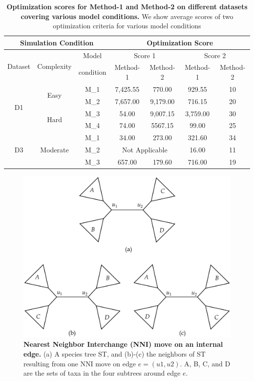 \documentclass[a4paper]{article}
\begin{document}
\begin{table}[h]
    \centering
    \caption{\textbf{Optimization scores for Method-1 and Method-2 on different datasets
covering various model conditions.} We show average scores of two optimization
criteria for various model conditions}
    \begin{tabular}{|c|cc|cc|cc|}
         \hline
         \multicolumn{3}{|c|}{Simulation Condition} & \multicolumn{4}{|c|}{Optimization Score} \\
         \hline
         \multirow{2}{*}{Dataset} & \multirow{2}{*}{Complexity} & Model & \multicolumn{2}{|c|}{Score 1} &  \multicolumn{2}{|c|}{Score 2} \\
         \cline{4-7}
         & & condition & Method-1 & Method-2 & Method-1 & Method-2 \\
         \hline
         \hline
         \multirow{4}{*}{D1} & \multirow{2}{*}{Easy} & M_1 & 7,425.55 & 770.00 & 929.55 & 10 \\
         & & M_2 & 7,657.00 & 9,179.00 & 716.15 & 20 \\
         \cline{2-7}
         & \multirow{2}{*}{Hard} & M_3 & 54.00 & 9,007.15 & 3,759.00 & 30 \\
         & & M_4 & 74.00 & 5567.15 & 99.00 & 25 \\
         \hline
         \hline
         \multirow{3}{*}{D3} & \multirow{3}{*}{Moderate} & M_1 & 34.00 & 273.00 & 321.60 & 34 \\
         & & M_2 & \multicolumn{2}{|c|}{Not Applicable} & 16.00  & 11 \\
         & & M_3 & 657.00 & 179.60 & 716.00 & 19 \\
         \hline
    \end{tabular}
    
    \label{tab:table1}
\end{table}
\pagebreak
\begin{figure}[t]
    \centering
    \includegraphics[width=.7\textwidth]{Figure3}
    \caption{ \textbf{Nearest Neighbor Interchange (NNI) move on an internal edge.} (a)
A species tree ST, and (b)-(c) the neighbors of ST resulting from one NNI move on edge
$e = (u1, u2)$. A, B, C, and D are the sets of taxa in the four subtrees around edge $e$.}
    \label{fig:fig1}
\end{figure}
\end{document}
